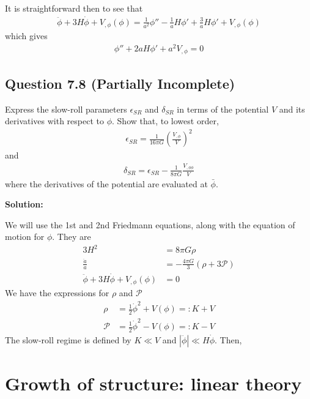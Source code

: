 \documentclass[11pt]{article}
\begin{document}
It is straightforward then to see that 
\begin{align*}
    \ddot{\phi} + 3H \dot{\phi} + V_{, \phi}(\phi) = \frac{1}{a^2}\phi'' - \frac{1}{a}H\phi' + \frac{3}{a}H\phi' + V_{,\phi} (\phi) 
\end{align*} 
which gives 
\begin{align*}
    \phi'' + 2aH\phi' + a^2 V_{,\phi} = 0
\end{align*}

\subsection{Question 7.8 (Partially Incomplete)}
Express the slow-roll parameters $\epsilon_{SR}$ and $\delta_{SR}$ in terms of the potential $V$ and its derivatives with respect to $\phi$. Show that, to lowest order, 
\begin{align*}
    \epsilon_{SR} = \frac{1}{16\pi G} \left( \frac{V_{,\phi}}{V}\right)^2 
\end{align*}
and 
\begin{align*}
    \delta_{SR} = \epsilon_{SR} - \frac{1}{8\pi G}\frac{V_{, \phi \phi}}{V}
\end{align*}
where the derivatives of the potential are evaluated at $\bar{\phi}$. 

\textbf{Solution:}

We will use the 1st and 2nd Friedmann equations, along with the equation of motion for $\phi$. They are
\begin{align*}
    3H^2 &= 8\pi G \rho \\
    \frac{\ddot{a}}{a} &= -\frac{4\pi G}{3}(\rho + 3\mathcal{P}) \\
    \ddot{\phi} + 3H\dot{\phi} + V_{,\phi}(\phi) &= 0 
\end{align*}
We have the expressions for $\rho$ and $\mathcal{P}$
\begin{align*}
    \rho &= \frac{1}{2}\dot{\phi}^2 + V(\phi) =: K+V\\
    \mathcal{P} &= \frac{1}{2}\dot{\phi}^2- V(\phi) =: K-V
\end{align*}
The slow-roll regime is defined by $K \ll V$ and $|\ddot{\phi}| \ll H \dot{\phi}$. Then, 

\section{Growth of structure: linear theory}
\end{document}
